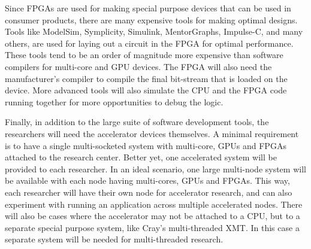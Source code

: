 Since FPGAs are used for making special purpose devices that can be used in consumer products, there are many expensive tools for making optimal designs. Tools like ModelSim, Symplicity, Simulink, MentorGraphs, Impulse-C, and many others, are used for laying out a circuit in the FPGA for optimal performance. These tools tend to be an order of magnitude more expensive than software compilers for multi-core and GPU devices. The FPGA will also need the manufacturer’s compiler to compile the final bit-stream that is loaded on the device. More advanced tools will also simulate the CPU and the FPGA code running together for more opportunities to debug the logic.

Finally, in addition to the large suite of software development tools, the researchers will need the accelerator devices themselves. A minimal requirement is to have a single multi-socketed system with multi-core, GPUs and FPGAs attached to the research center. Better yet, one accelerated system will be provided to each researcher. In an ideal scenario, one large multi-node system will be available with each node having multi-cores, GPUs and FPGAs. This way, each researcher will have their own node for accelerator research, and can also experiment with running an application across multiple accelerated nodes. There will also be cases where the accelerator may not be attached to a CPU, but to a separate
special purpose system, like Cray’s multi-threaded XMT. In this case a separate system will be needed for multi-threaded research.

